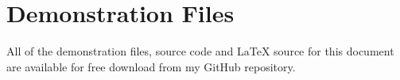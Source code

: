 \chapter{Demonstration Files}

All of the demonstration files, source code and \LaTeX{} source for this document are available for free download from my GitHub repository.

